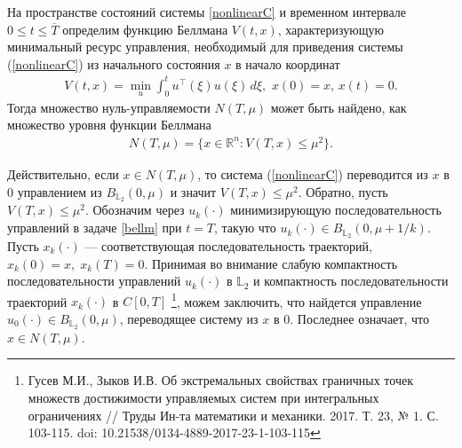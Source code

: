 \documentclass[../main.tex]{subfiles}
\begin{document}
На пространстве состояний системы \eqref{nonlinearC} и временном интервале $ 0 \leqslant t \leqslant \overline{T} $ определим функцию Беллмана $ V(t,x) $, характеризующую минимальный ресурс управления, необходимый для приведения системы (\ref{nonlinearC}) из начального состояния $x$ в начало координат
\begin{gather}\label{bellm}
	V(t,x) = \min\limits_{u} \int_{0}^{t} u^{\top}(\xi) u(\xi) \,d\xi, \, \,x(0)=x,\,x(t)=0.
\end{gather}
Тогда множество нуль-управляемости $ N(T,\mu) $ может быть найдено, как множество уровня функции Беллмана
\begin{gather*}
	N(T,\mu)  = \{x \in \mathbb{R}^n: V(T,x) \leqslant \mu^2\}.
\end{gather*}

Действительно, если $ x\in N(T,\mu) $, то система (\ref{nonlinearC}) переводится из $x$ в $0$ управлением из $B_{\mathbb{L}_2}(0,\mu)$ и значит  $V(T,x) \leqslant \mu^2$. Обратно,
пусть $V(T,x) \leqslant \mu^2$. 
Обозначим через $u_k(\cdot)$ минимизирующую последовательность управлений в задаче \eqref{bellm} при $t=T$, такую что  $u_k(\cdot) \in B_{\mathbb{L}_2}(0,\mu+1/k)$. Пусть $x_k(\cdot)$ --- соответствующая последовательность траекторий, $x_k(0)=x,\;x_k(T)=0$. Принимая во внимание слабую компактность последовательности управлений   $u_k(\cdot)$ в $\mathbb{L}_2$ и компактность последовательности траекторий  $x_k(\cdot)$ в $ C[0,T]$ \footnote{Гусев М.И., Зыков И.В.  Об экстремальных свойствах граничных точек множеств достижимости управляемых систем при интегральных ограничениях  // Труды Ин-та математики и механики. 2017. Т. 23, № 1. С. 103-115. doi: 10.21538/0134-4889-2017-23-1-103-115}, можем заключить, что найдется управление  $u_0(\cdot)\in B_{\mathbb{L}_2}(0,\mu)$, переводящее систему из $x$ в $0$. Последнее означает, что $x \in 	N(T,\mu)$. 
\end{document}
